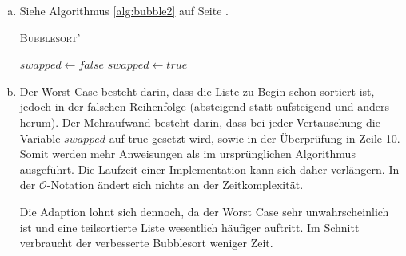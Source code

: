 \documentclass[a4paper]{scrartcl}
\begin{document}
\begin{enumerate}[(a)]
    \item Siehe Algorithmus \ref{alg:bubble2} auf Seite \pageref{alg:bubble2}.
        \begin{algorithm}[h]
            \caption{\textsc{Bubblesort'}}
            \label{alg:bubble2}
            \begin{algorithmic}[1]
                        \State $swapped \gets false$
                                \State {}
                                \State $swapped \gets true$
                            \EndIf
                        \EndFor
                            \State \Return
                        \EndIf
                    \EndFor
                \EndProcedure
            \end{algorithmic}
        \end{algorithm}

    \item
        Der Worst Case besteht darin, dass die Liste zu Begin schon sortiert
        ist, jedoch in der falschen Reihenfolge (absteigend statt aufsteigend
        und anders herum).
        Der Mehraufwand besteht darin, dass bei jeder Vertauschung die
        Variable $swapped$ auf true gesetzt wird, sowie in der Überprüfung
        in Zeile 10.
        Somit werden mehr Anweisungen als im ursprünglichen Algorithmus
        ausgeführt.
        Die Laufzeit einer Implementation kann sich daher verlängern.
        In der $\mathcal{O}$-Notation ändert sich nichts an der Zeitkomplexität.

        Die Adaption lohnt sich dennoch, da der Worst Case sehr unwahrscheinlich
        ist und eine teilsortierte Liste wesentlich häufiger auftritt.
        Im Schnitt verbraucht der verbesserte Bubblesort weniger Zeit.


\end{enumerate}
\end{document}
